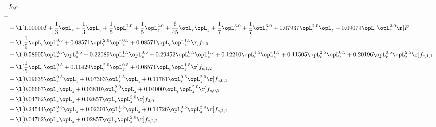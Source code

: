 \begin{alignat}{2} 
\label{eq:f_00_2} 
& f_{0,0} \nonumber \\ 
 = \\ 
& + \l[  1.00000 I + \frac{1}{3} \opL_r + \frac{1}{3} \opL_z + \frac{1}{5} \opL_r^{2.0} + \frac{1}{5} \opL_z^{2.0} + \frac{6}{45} \opL_r \opL_z + \frac{1}{7} \opL_r^{3.0} + \frac{1}{7} \opL_z^{3.0} +  0.07937 \opL_r^{2.0} \opL_z +  0.09079 \opL_r \opL_z^{2.0}  \r] F \nonumber \\ 
& - \l[ \frac{1}{5} \opL_r \opL_z^{0.5} +  0.08571 \opL_r^{2.0} \opL_z^{0.5} +  0.08571 \opL_r \opL_z^{1.5}  \r] f_{1,0} \nonumber \\ 
& + \l[  0.58905 \opL_r^{0.5} \opL_z^{0.5} +  0.22089 \opL_r^{1.5} \opL_z^{0.5} +  0.29452 \opL_r^{0.5} \opL_z^{1.5} +  0.12210 \opL_r^{1.5} \opL_z^{1.5} +  0.11505 \opL_r^{2.5} \opL_z^{0.5} +  0.20196 \opL_r^{0.5} \opL_z^{2.5}  \r] f_{c,1,1} \nonumber \\ 
& - \l[ \frac{1}{5} \opL_r \opL_z^{0.5} +  0.11429 \opL_r^{2.0} \opL_z^{0.5} +  0.08571 \opL_r \opL_z^{1.5}  \r] f_{c,1,2} \nonumber \\ 
& - \l[  0.19635 \opL_r^{0.5} \opL_z +  0.07363 \opL_r^{1.5} \opL_z +  0.11781 \opL_r^{0.5} \opL_z^{2.0}  \r] f_{c,0,1} \nonumber \\ 
& + \l[  0.06667 \opL_r \opL_z +  0.03810 \opL_r^{2.0} \opL_z +  0.04000 \opL_r \opL_z^{2.0}  \r] f_{c,0,2} \nonumber \\ 
& + \l[  0.04762 \opL_r \opL_z +  0.02857 \opL_r \opL_z^{2.0}  \r] f_{2,0} \nonumber \\ 
& - \l[  0.24544 \opL_r^{0.5} \opL_z +  0.02301 \opL_r^{1.5} \opL_z +  0.14726 \opL_r^{0.5} \opL_z^{2.0}  \r] f_{c,2,1} \nonumber \\ 
& + \l[  0.04762 \opL_r \opL_z +  0.02857 \opL_r \opL_z^{2.0}  \r] f_{c,2,2} \nonumber \\ 
\end{alignat} 


